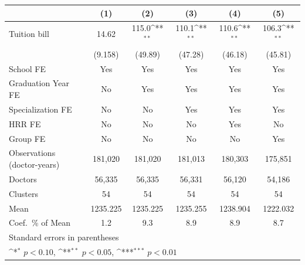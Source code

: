 {
\def\sym#1{\ifmmode^{#1}\else\(^{#1}\)\fi}
\begin{tabular}{l*{5}{c}}
\hline\hline
                    &\multicolumn{1}{c}{(1)}         &\multicolumn{1}{c}{(2)}         &\multicolumn{1}{c}{(3)}         &\multicolumn{1}{c}{(4)}         &\multicolumn{1}{c}{(5)}         \\
\hline
Tuition bill        &       14.62         &       115.0\sym{**} &       110.1\sym{**} &       110.6\sym{**} &       106.3\sym{**} \\
                    &     (9.158)         &     (49.89)         &     (47.28)         &     (46.18)         &     (45.81)         \\
[1em]
School FE           &         Yes         &         Yes         &         Yes         &         Yes         &         Yes         \\
[1em]
Graduation Year FE  &          No         &         Yes         &         Yes         &         Yes         &         Yes         \\
[1em]
Specialization FE   &          No         &          No         &         Yes         &         Yes         &         Yes         \\
[1em]
HRR FE              &          No         &          No         &          No         &         Yes         &          No         \\
[1em]
Group FE            &          No         &          No         &          No         &          No         &         Yes         \\
\hline
Observations (doctor-years)&     181,020         &     181,020         &     181,013         &     180,303         &     175,851         \\
Doctors             &      56,335         &      56,335         &      56,331         &      56,120         &      54,186         \\
Clusters            &          54         &          54         &          54         &          54         &          54         \\
Mean                &    1235.225         &    1235.225         &    1235.255         &    1238.904         &    1222.032         \\
Coef.\ \% of Mean   &         1.2         &         9.3         &         8.9         &         8.9         &         8.7         \\
\hline\hline
\multicolumn{6}{l}{\footnotesize Standard errors in parentheses}\\
\multicolumn{6}{l}{\footnotesize \sym{*} \(p<0.10\), \sym{**} \(p<0.05\), \sym{***} \(p<0.01\)}\\
\end{tabular}
}
